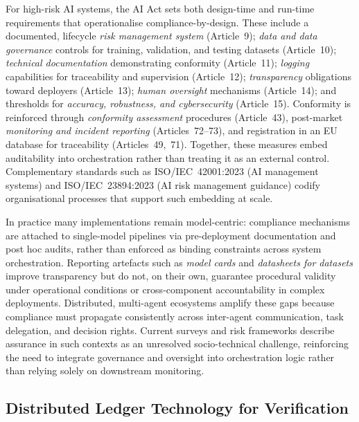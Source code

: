 \documentclass[oneside,10pt]{swissi}
\begin{document}
For high-risk AI systems, the AI Act sets both design-time and run-time requirements that operationalise compliance-by-design. These include a documented, lifecycle \emph{risk management system} (Article~9); \emph{data and data governance} controls for training, validation, and testing datasets (Article~10); \emph{technical documentation} demonstrating conformity (Article~11); \emph{logging} capabilities for traceability and supervision (Article~12); \emph{transparency} obligations toward deployers (Article~13); \emph{human oversight} mechanisms (Article~14); and thresholds for \emph{accuracy, robustness, and cybersecurity} (Article~15).\cite{eu_ai_act_2024} Conformity is reinforced through \emph{conformity assessment} procedures (Article~43), post-market \emph{monitoring and incident reporting} (Articles~72–73), and registration in an EU database for traceability (Articles~49,~71). Together, these measures embed auditability into orchestration rather than treating it as an external control.\cite{eu_ai_act_2024} Complementary standards such as ISO/IEC~42001:2023 (AI management systems) and ISO/IEC~23894:2023 (AI risk management guidance) codify organisational processes that support such embedding at scale.\cite{iso42001,iso23894}

In practice many implementations remain model-centric: compliance mechanisms are attached to single-model pipelines via pre-deployment documentation and post hoc audits, rather than enforced as binding constraints across system orchestration.\cite{raji2020accountability,costanzachock2022whoaudits} Reporting artefacts such as \emph{model cards} and \emph{datasheets for datasets} improve transparency but do not, on their own, guarantee procedural validity under operational conditions or cross-component accountability in complex deployments.\cite{mitchell2019modelcards,gebru2021datasheets} Distributed, multi-agent ecosystems amplify these gaps because compliance must propagate consistently across inter-agent communication, task delegation, and decision rights. Current surveys and risk frameworks describe assurance in such contexts as an unresolved socio-technical challenge, reinforcing the need to integrate governance and oversight into orchestration logic rather than relying solely on downstream monitoring.\cite{yao2024llmsecpriv,nist_ai_rmf_2023}

\subsection{Distributed Ledger Technology for Verification}
\end{document}
